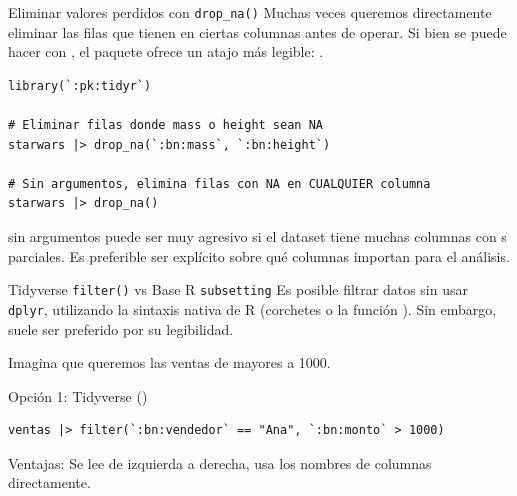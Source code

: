\documentclass[8pt]{beamer}
\begin{document}
\begin{frame}[fragile]{Eliminar valores perdidos con \texttt{drop\_na()}}
Muchas veces queremos directamente eliminar las filas que tienen  en ciertas columnas antes de operar. Si bien se puede hacer con , el paquete  ofrece un atajo más legible: .

\begin{lstlisting}[style=RScript]
library(`:pk:tidyr`)

# Eliminar filas donde mass o height sean NA
starwars |> drop_na(`:bn:mass`, `:bn:height`)

# Sin argumentos, elimina filas con NA en CUALQUIER columna
starwars |> drop_na()
\end{lstlisting}

\begin{alertblock}{}
 sin argumentos puede ser muy agresivo si el dataset tiene muchas columnas con s parciales. Es preferible ser explícito sobre qué columnas importan para el análisis.
\end{alertblock}
\end{frame}




\begin{frame}[fragile]{Tidyverse \texttt{filter()} vs Base R \texttt{subsetting}}
	Es posible filtrar datos sin usar \texttt{dplyr}, utilizando la sintaxis nativa de R (corchetes \rscript{[]} o la función ). Sin embargo,  suele ser preferido por su legibilidad.


	Imagina que queremos las ventas de  mayores a 1000.

Opción 1: Tidyverse ()
\begin{lstlisting}[style=RScript]
ventas |> filter(`:bn:vendedor` == "Ana", `:bn:monto` > 1000)
\end{lstlisting}

Ventajas: Se lee de izquierda a derecha, usa los nombres de columnas directamente.
\end{frame}
\end{document}
